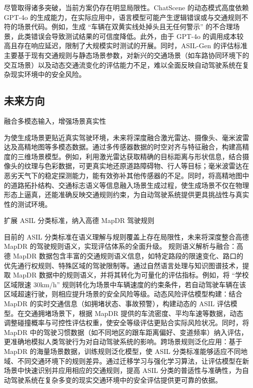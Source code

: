 尽管取得诸多突破，当前方案仍存在明显局限性。ChatScene 的动态模式高度依赖 GPT-4o 的生成能力，在实际应用中，语言模型可能产生逻辑错误或与交通规则不符的场景代码。例如，生成 “车辆在双黄实线处掉头且无任何警示” 的不合理场景，此类错误会导致测试结果的可信度降低。此外，由于 GPT-4o 的调用成本较高且存在响应延迟，限制了大规模实时测试的开展。同时，ASIL-Gen 的评估标准主要基于现有交通规则与静态场景参数，对新兴的交通场景（如车路协同环境下的交互场景）以及动态交通流变化的评估能力不足，难以全面反映自动驾驶系统在复杂现实环境中的安全风险。

\subsection{未来方向}
融合多模态输入，增强场景真实性

为使生成场景更贴近真实驾驶环境，未来将深度融合激光雷达、摄像头、毫米波雷达及高精地图等多模态数据。通过多传感器数据的时空对齐与特征融合，构建高精度的三维场景模型。例如，利用激光雷达获取精确的目标距离与形状信息，结合摄像头的纹理与色彩数据，可更真实地还原道路障碍物、行人等目标；毫米波雷达在恶劣天气下的稳定探测能力，能有效弥补其他传感器的不足。同时，将高精地图中的道路拓扑结构、交通标志语义等信息融入场景生成过程，使生成场景不仅在物理形态上逼真，还能准确反映交通规则约束，为自动驾驶系统提供更具挑战性与真实性的测试环境。



扩展 ASIL 分类标准，纳入高德 MapDR 驾驶规则

目前的 ASIL 分类标准在语义理解与规则覆盖上存在局限性，未来将深度整合高德 MapDR 的驾驶规则语义，实现评估体系的全面升级。​
规则语义解析与融合：高德 MapDR 数据包含丰富的交通规则语义信息，如特定路段的限速变化、路口的优先通行权规则、特殊区域的驾驶限制等。通过自然语言处理与知识图谱技术，提取 MapDR 数据中的规则语义，并将其转化为可量化的评估指标。例如，将 “学校区域限速 30km/h” 规则转化为场景中车辆速度的约束条件，若自动驾驶车辆在该区域超速行驶，则相应提升场景的安全风险等级。​
动态风险评估模型构建：结合 MapDR 的实时交通信息（如拥堵状态、事故预警），构建动态的 ASIL 评估模型。在交通拥堵场景下，根据 MapDR 提供的车流密度、平均车速等数据，动态调整碰撞概率与可控性评估权重，使安全等级评估更贴合实际风险状况。同时，将 MapDR 中的驾驶习惯数据（如不同地区的跟车距离偏好、变道频率）纳入评估，更准确地模拟人类驾驶行为对自动驾驶系统的影响。​
跨场景规则泛化应用：基于 MapDR 的海量场景数据，训练规则泛化模型，使 ASIL 分类标准能够适应不同地域、不同交通环境下的规则差异。通过迁移学习与强化学习算法，让评估模型在新场景中快速识别并应用相应的交通规则，提高 ASIL 分类的普适性与准确性，为自动驾驶系统在复杂多变的现实交通环境中的安全评估提供更可靠的依据。

\newpage


